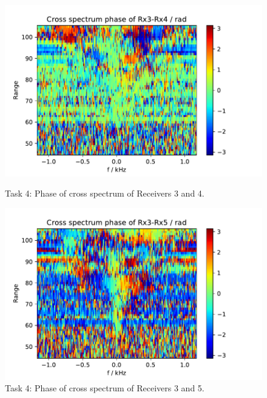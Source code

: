 \begin{figure}[H]
    \centering
    \begin{minipage}{0.48\textwidth}
        \centering
        \includegraphics[width=\textwidth]{graphics/t4/t4-phase-3-4.pdf}
    \caption{Task 4: Phase of cross spectrum of Receivers 3 and 4.}
    \label{fig:t4-phase-3-4}
    \end{minipage}\hfill
    \begin{minipage}{0.48\textwidth}
        \centering
        \includegraphics[width=\textwidth]{graphics/t4/t4-phase-3-5.pdf}
    \caption{Task 4: Phase of cross spectrum of Receivers 3 and 5.}
    \label{fig:t4-phase-3-5}
    \end{minipage}
\end{figure}
